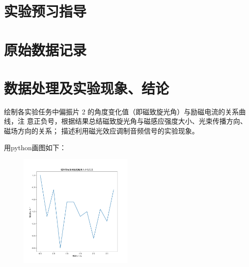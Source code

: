 \documentclass[signature=data]{physicsreport}
\begin{document}
\maketitle

\section{实验预习指导}
\newpage

\section{原始数据记录}
\makeatletter
{}
\makeatother

\newpage

\section{数据处理及实验现象、结论}

绘制各实验任务中偏振片 2 的角度变化值（即磁致旋光角）与励磁电流的关系曲线，注
意正负号，根据结果总结磁致旋光角与磁感应强度大小、光束传播方向、磁场方向的关系；
描述利用磁光效应调制音频信号的实验现象。

用python画图如下：

\begin{figure}[H]
    \centering
    \includegraphics[width=0.5\textwidth]{./images/lab11/T3_1.png}
    
    \label{fig:magneto_optic_effect1}
\end{figure}
\end{document}
